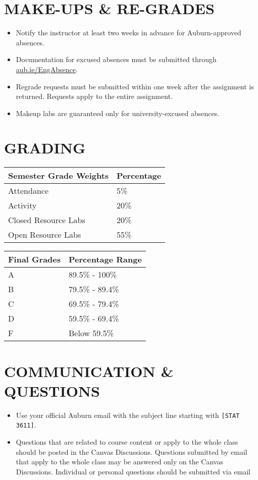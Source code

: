 \documentclass[12pt]{article}
\begin{document}
\section*{MAKE-UPS \& RE-GRADES}
\begin{itemize}
    \item Notify the instructor at least two weeks in advance for Auburn-approved absences.
    \item Documentation for excused absences must be submitted through \href{https://aub.ie/EngAbsence}{aub.ie/EngAbsence}.
    \item Regrade requests must be submitted within one week after the assignment is returned. Requests apply to the entire assignment.
    \item Makeup labs are guaranteed only for university-excused absences.
\end{itemize}

\section*{GRADING}
\begin{center}
\begin{tabular}{|l|l|}
\hline
\textbf{Semester Grade Weights} & \textbf{Percentage} \\ \hline
Attendance & 5\% \\ \hline
Activity & 20\% \\ \hline
Closed Resource Labs & 20\% \\ \hline
Open Resource Labs & 55\% \\ \hline
\end{tabular}

\vspace{1em}

\begin{tabular}{|l|l|}
\hline
\textbf{Final Grades} & \textbf{Percentage Range} \\ \hline
A & 89.5\% - 100\% \\ \hline
B & 79.5\% - 89.4\% \\ \hline
C & 69.5\% - 79.4\% \\ \hline
D & 59.5\% - 69.4\% \\ \hline
F & Below 59.5\% \\ \hline
\end{tabular}
\end{center}

\section*{COMMUNICATION \& QUESTIONS}
\begin{itemize}
    \item Use your official Auburn email with the subject line starting with \texttt{[STAT 3611]}.
        \item Questions that are related to course content or apply to the whole class should be posted in the Canvas Discussions. Questions submitted by email that apply to the whole class may be answered only on the Canvas Discussions. Individual or personal questions should be submitted via email
\end{itemize}
\end{document}
